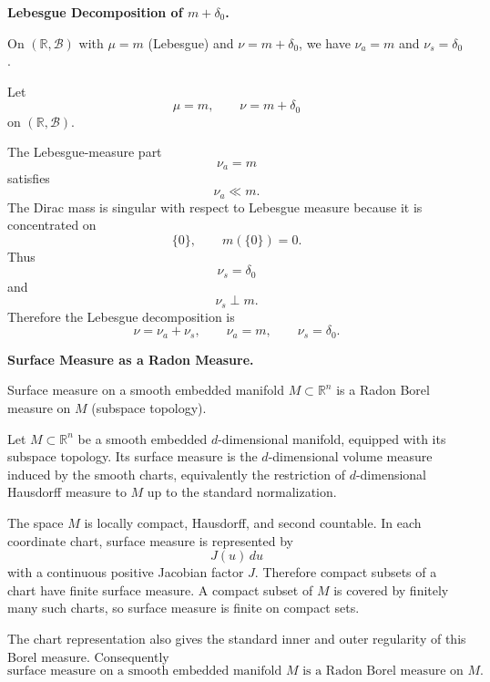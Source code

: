 \begin{problem}[CP-II-0412]
\label{prob:cp-ii-0412}
\textbf{Lebesgue Decomposition of \(m+\delta_0\).}

\hspace*{1.5em}On $(\mathbb{R},\mathcal B)$ with $\mu=m$ (Lebesgue) and $\nu=m+\delta_0$, we have
		$\nu_a=m$ and $\nu_s=\delta_0$.
\end{problem}

\begin{solution}
Let
\[
\mu=m,
\qquad
\nu=m+\delta_0
\]
on \((\mathbb R,\mathcal B)\).

The Lebesgue-measure part
\[
\nu_a=m
\]
satisfies
\[
\nu_a\ll m.
\]
The Dirac mass is singular with respect to Lebesgue measure because it is concentrated on
\[
\{0\},
\qquad
m(\{0\})=0.
\]
Thus
\[
\nu_s=\delta_0
\]
and
\[
\nu_s\perp m.
\]
Therefore the Lebesgue decomposition is
\[
\boxed{
\nu=\nu_a+\nu_s,
\qquad
\nu_a=m,
\qquad
\nu_s=\delta_0.
}
\]
\end{solution}


\begin{problem}[CP-II-0414]
\label{prob:cp-ii-0414}
\textbf{Surface Measure as a Radon Measure.}

\hspace*{1.5em}Surface measure on a smooth embedded manifold $M\subset\mathbb{R}^n$ is a Radon Borel measure on $M$ (subspace topology).
\end{problem}

\begin{solution}
Let \(M\subset\mathbb R^n\) be a smooth embedded \(d\)-dimensional manifold, equipped with
its subspace topology. Its surface measure is the \(d\)-dimensional volume measure induced
by the smooth charts, equivalently the restriction of \(d\)-dimensional Hausdorff measure to
\(M\) up to the standard normalization.

The space \(M\) is locally compact, Hausdorff, and second countable. In each coordinate
chart, surface measure is represented by
\[
J(u)\,du
\]
with a continuous positive Jacobian factor \(J\). Therefore compact subsets of a chart have
finite surface measure. A compact subset of \(M\) is covered by finitely many such charts, so
surface measure is finite on compact sets.

The chart representation also gives the standard inner and outer regularity of this Borel
measure. Consequently
\[
\boxed{
\text{surface measure on a smooth embedded manifold }M
\text{ is a Radon Borel measure on }M.
}
\]
\end{solution}


